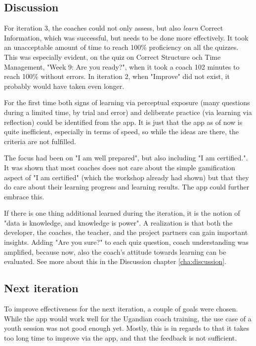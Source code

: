 \subsection{Discussion}

  For iteration 3, the coaches could not only assess, but also \textit{learn} Correct Information, which was successful, but needs to be done more effectively. It took an unacceptable amount of time to reach 100\% proficiency on all the quizzes. This was especially evident, on the quiz on Correct Structure och Time Management, "Week 9: Are you ready?", when it took a coach 102 minutes to reach 100\% without errors. In iteration 2, when "Improve" did not exist, it probably would have taken even longer.

  For the first time both signs of learning via perceptual exposure (many questions during a limited time, by trial and error) and deliberate practice (via learning via reflection) could be identified from the app. It is just that the app as of now is quite inefficient, especially in terms of speed, so while the ideas are there, the criteria are not fulfilled.

  The focus had been on "I am well prepared", but also including "I am certified.". It was shown that most coaches does not care about the simple gamification aspect of "I am certified" (which the workshop already had shown) but that they do care about their learning progress and learning results. The app could further embrace this.

  If there is one thing additional learned during the iteration, it is the notion of "data is knowledge, and knowledge is power". A realization is that both the developer, the coaches, the teacher, and the project partners can gain important insights. Adding "Are you sure?" to each quiz question, coach understanding was amplified, because now, also the coach's attitude towards learning can be evaluated. See more about this in the Discussion chapter \ref{cha:discussion}.

  \subsection{Next iteration}
  To improve effectiveness for the next iteration, a couple of goals were chosen. While the app would work well for the Ugandian coach training, the use case of a youth session was not good enough yet. Mostly, this is in regards to that it takes too long time to improve via the app, and that the feedback is not sufficient.


